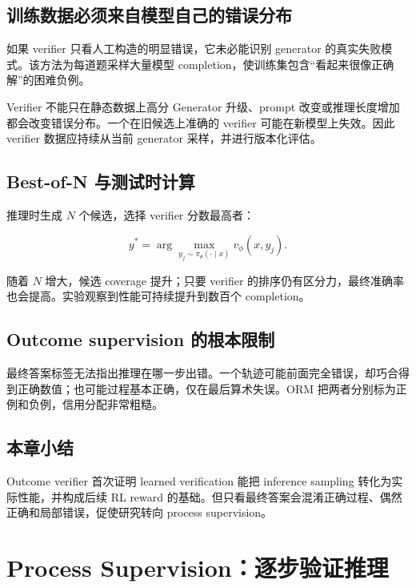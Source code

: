 \documentclass[a4paper]{article}
\begin{document}
\subsection{训练数据必须来自模型自己的错误分布}

如果 verifier 只看人工构造的明显错误，它未必能识别 generator 的真实失败模式。该方法为每道题采样大量模型 completion，使训练集包含“看起来很像正确解”的困难负例。

\begin{warningbox}{Verifier 不能只在静态数据上高分}
Generator 升级、prompt 改变或推理长度增加都会改变错误分布。一个在旧候选上准确的 verifier 可能在新模型上失效。因此 verifier 数据应持续从当前 generator 采样，并进行版本化评估。
\end{warningbox}

\subsection{Best-of-N 与测试时计算}

推理时生成 $N$ 个候选，选择 verifier 分数最高者：

$$
y^*=\arg\max_{y_j\sim\pi_\theta(\cdot\mid x)} v_\phi(x,y_j).
$$

随着 $N$ 增大，候选 coverage 提升；只要 verifier 的排序仍有区分力，最终准确率也会提高。实验观察到性能可持续提升到数百个 completion。


\subsection{Outcome supervision 的根本限制}

最终答案标签无法指出推理在哪一步出错。一个轨迹可能前面完全错误，却巧合得到正确数值；也可能过程基本正确，仅在最后算术失误。ORM 把两者分别标为正例和负例，信用分配非常粗糙。

\subsection{本章小结}

Outcome verifier 首次证明 learned verification 能把 inference sampling 转化为实际性能，并构成后续 RL reward 的基础。但只看最终答案会混淆正确过程、偶然正确和局部错误，促使研究转向 process supervision。

\section{Process Supervision：逐步验证推理}
\end{document}
